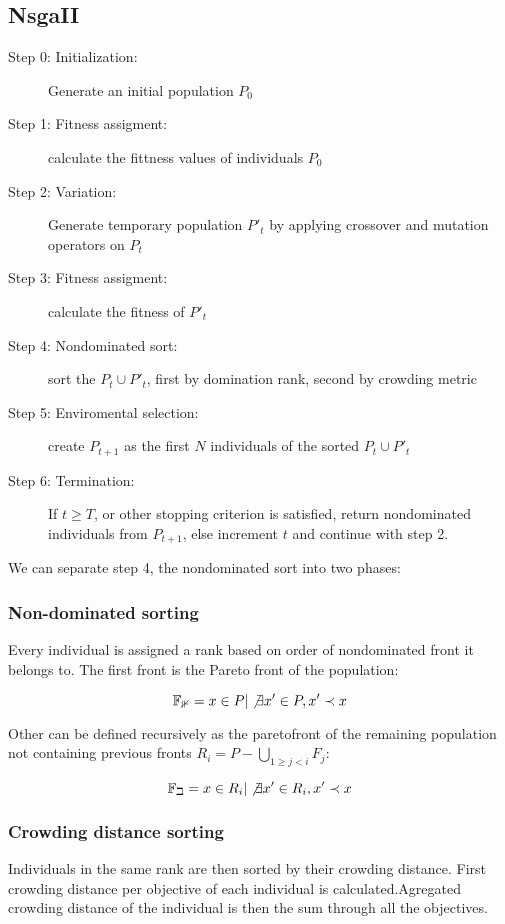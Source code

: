 \documentclass[12pt,oneside,draft]{fithesis2}
\begin{document}
\subsection{NsgaII}

\begin{description}
	\item[Step 0: Initialization:] Generate an initial population $P_0$ 
	\item[Step 1: Fitness assigment:] calculate the fittness values of individuals $P_0$
	\item[Step 2: Variation:] Generate temporary population $P'_t$ by applying crossover and mutation operators on $P_t$
	\item[Step 3: Fitness assigment:] calculate the fitness of $P'_t$
	\item[Step 4: Nondominated sort:] sort the $P_t \cup P'_t$, first by domination rank, second by crowding metric
	\item[Step 5: Enviromental selection:] create $P_{t+1}$ as the first $N$ individuals of the sorted $P_t \cup P'_t$
	\item[Step 6: Termination:] If $t \geq T$, or other stopping criterion is satisfied, return nondominated individuals from $P_{t+1}$, else increment $t$ and continue with step 2.
\end{description}

We can separate step 4, the nondominated sort into two phases:

\subsubsection{Non-dominated sorting}
Every individual is assigned a rank based on order of nondominated front it belongs to. The first front is the Pareto front of the population:

$$\mathbb{F_1} = {x \in P | \not \exists x' \in P, x' \prec x} $$

Other can be defined recursively as the paretofront of the remaining population not containing previous fronts $R_i = P - \bigcup\limits_{1\geq j < i} F_j$:

$$\mathbb{F_i} = {x \in R_i | \not \exists x' \in R_i, x' \prec x} $$

\subsubsection{Crowding distance sorting}

Individuals in the same rank are then sorted by their crowding distance. First crowding distance per objective of each individual is calculated.Agregated crowding distance of the individual is then the sum through all the objectives.
\end{document}
